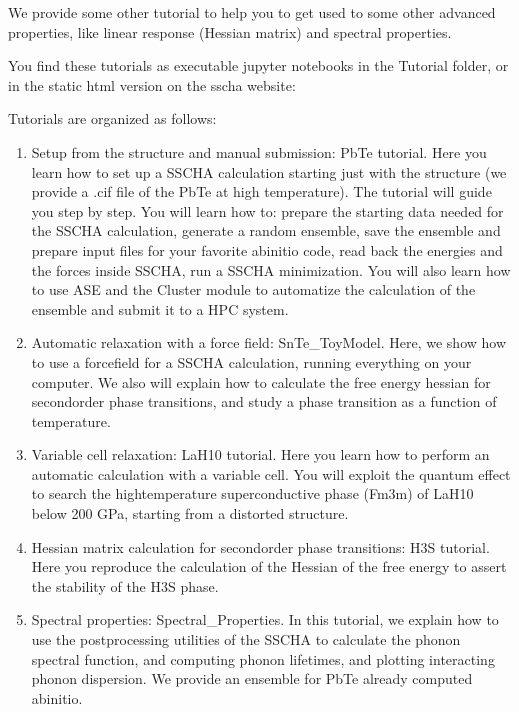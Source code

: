 \documentclass[a4paper,11pt,english]{sphinxmanual}
\begin{document}
\sphinxAtStartPar
We provide some other tutorial to help you to get used to some other advanced properties, like linear response (Hessian matrix) and spectral properties.

\sphinxAtStartPar
You find these tutorials as executable jupyter notebooks in the Tutorial folder, or in the static html version on the sscha website: 

\sphinxAtStartPar
Tutorials are organized as follows:
\begin{enumerate}
%
\item {} 
\sphinxAtStartPar
Setup from the structure and manual submission: PbTe tutorial. Here you learn how to set up a SSCHA calculation starting just with the structure (we provide a .cif file of the PbTe at high temperature). The tutorial will guide you step by step. You will learn how to: prepare the starting data needed for the SSCHA calculation, generate a random ensemble, save the ensemble and prepare input files for your favorite ab\sphinxhyphen{}initio code, read back the energies and the forces inside SSCHA, run a SSCHA minimization. You will also learn how to use ASE and the Cluster module to automatize the calculation of the ensemble and submit it to a HPC system.

\item {} 
\sphinxAtStartPar
Automatic relaxation with a force field: SnTe\_ToyModel. Here, we show how to use a force\sphinxhyphen{}field for a SSCHA calculation, running everything on your computer. We also will explain how to calculate the free energy hessian for second\sphinxhyphen{}order phase transitions, and study a phase transition as a function of temperature.

\item {} 
\sphinxAtStartPar
Variable cell relaxation: LaH10 tutorial. Here you learn how to perform an automatic calculation with a variable cell. You will exploit the quantum effect to search the high\sphinxhyphen{}temperature superconductive phase (Fm\sphinxhyphen{}3m) of LaH10 below 200 GPa, starting from a distorted structure.

\item {} 
\sphinxAtStartPar
Hessian matrix calculation for second\sphinxhyphen{}order phase transitions: H3S tutorial. Here you reproduce the calculation of the Hessian of the free energy to assert the stability of the H3S phase.

\item {} 
\sphinxAtStartPar
Spectral properties: Spectral\_Properties. In this tutorial, we explain how to use the post\sphinxhyphen{}processing utilities of the SSCHA to calculate the phonon spectral function, and computing phonon lifetimes, and plotting interacting phonon dispersion. We provide an ensemble for PbTe already computed ab\sphinxhyphen{}initio.

\end{enumerate}
\end{document}
